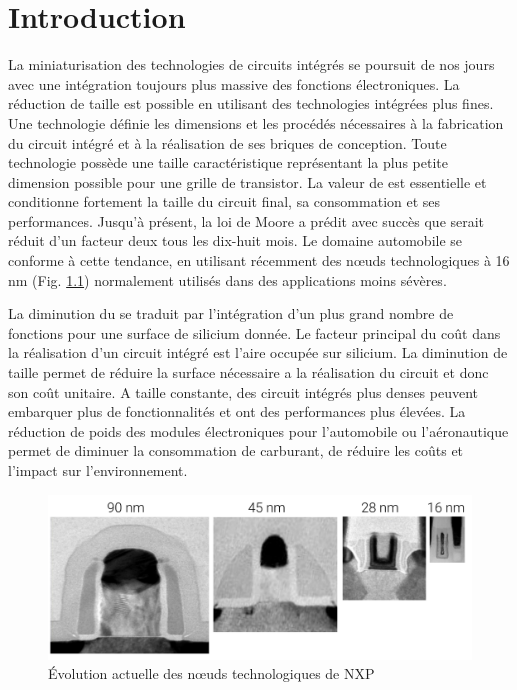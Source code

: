 \chapter{Introduction}

La miniaturisation des technologies de circuits intégrés se poursuit de nos jours avec une intégration toujours plus massive des fonctions électroniques.
La réduction de taille est possible en utilisant des technologies intégrées plus fines.
Une technologie définie les dimensions et les procédés nécessaires à la fabrication du circuit intégré et à la réalisation de ses briques de conception.
Toute technologie possède une taille caractéristique \textlambda{} représentant la plus petite dimension possible pour une grille de transistor.
La valeur de \textlambda{} est essentielle et conditionne fortement la taille du circuit final, sa consommation et ses performances.
Jusqu'à présent, la loi de Moore a prédit avec succès que \textlambda{} serait réduit d'un facteur deux tous les dix-huit mois.
Le domaine automobile se conforme à cette tendance, en utilisant récemment des nœuds technologiques à 16 nm (Fig. \ref{fig:nxp-techno-increase}) \cite{evolution_technologies} normalement utilisés dans des applications moins sévères.

La diminution du \textlambda{} se traduit par l'intégration d'un plus grand nombre de fonctions pour une surface de silicium donnée.
Le facteur principal du coût dans la réalisation d'un circuit intégré est l'aire occupée sur silicium.
La diminution de taille permet de réduire la surface nécessaire a la réalisation du circuit et donc son coût unitaire.
A taille constante, des circuit intégrés plus denses peuvent embarquer plus de fonctionnalités et ont des performances plus élevées.
La réduction de poids des modules électroniques pour l'automobile ou l'aéronautique permet de diminuer la consommation de carburant, de réduire les coûts et l'impact sur l'environnement.

\begin{figure}[!h]
  \centering
  \includegraphics[width=\textwidth]{src/1/figures/technology_evolution.pdf}
  \caption{Évolution actuelle des nœuds technologiques de NXP \cite{evolution_technologies}}
  \label{fig:nxp-techno-increase}
\end{figure}

